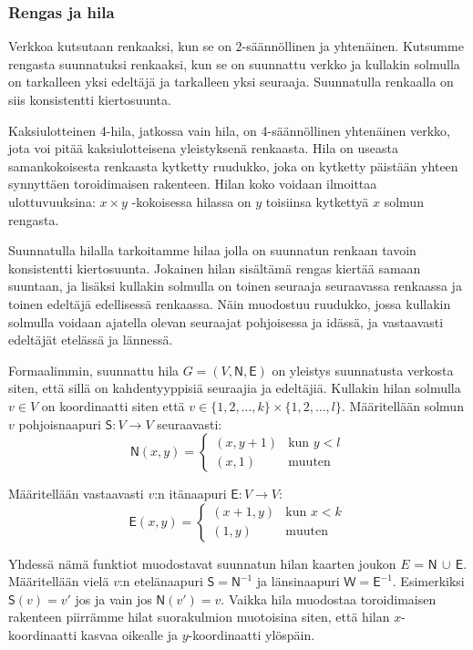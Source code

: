 \documentclass[12pt,finnish]{tktltiki2}
\theoremstyle{definition}
\theoremstyle{remark}
\begin{document}


\subsubsection{Rengas ja hila}

Verkkoa kutsutaan renkaaksi, kun se on $2$-säännöllinen ja yhtenäinen. Kutsumme rengasta suunnatuksi renkaaksi, kun se on suunnattu verkko ja kullakin solmulla on tarkalleen yksi edeltäjä ja tarkalleen yksi seuraaja. Suunnatulla renkaalla on siis konsistentti kiertosuunta.

Kaksiulotteinen 4-hila, jatkossa vain hila, on 4-säännöllinen yhtenäinen verkko, jota voi pitää kaksiulotteisena yleistyksenä renkaasta. Hila on useasta samankokoisesta renkaasta kytketty ruudukko, joka on kytketty päistään yhteen synnyttäen toroidimaisen rakenteen. Hilan koko voidaan ilmoittaa ulottuvuuksina: $x \times y$ -kokoisessa hilassa on $y$ toisiinsa kytkettyä $x$ solmun rengasta.

Suunnatulla hilalla tarkoitamme hilaa jolla on suunnatun renkaan tavoin konsistentti kiertosuunta. Jokainen hilan sisältämä rengas kiertää samaan suuntaan, ja lisäksi kullakin solmulla on toinen seuraaja seuraavassa renkaassa ja toinen edeltäjä edellisessä renkaassa. Näin muodostuu ruudukko, jossa kullakin solmulla voidaan ajatella olevan seuraajat pohjoisessa ja idässä, ja vastaavasti edeltäjät etelässä ja lännessä.

Formaalimmin, suunnattu hila $G = (V, \mathsf{N}, \mathsf{E})$ on yleistys suunnatusta verkosta siten, että sillä on kahdentyyppisiä seuraajia ja edeltäjiä. Kullakin hilan solmulla $v \in V$ on koordinaatti siten että $v \in \{1, 2, \ldots, k\} \times \{1, 2, \ldots, l\}$. Määritellään solmun $v$ pohjoisnaapuri $\mathsf{S}: V \rightarrow V$ seuraavasti:
\[ \mathsf{N}(x, y) = 
  \begin{cases}
   (x, y+1) & \text{kun } y < l \\
   (x, 1) & \text{muuten}
  \end{cases}
\]

Määritellään vastaavasti $v$:n itänaapuri $\mathsf{E}: V \rightarrow V$:
\[ \mathsf{E}(x, y) = 
  \begin{cases}
   (x+1, y) & \text{kun } x < k \\
   (1, y) & \text{muuten}
  \end{cases}
\]

Yhdessä nämä funktiot muodostavat suunnatun hilan kaarten joukon $E$ = $\mathsf{N} \, \cup \, \mathsf{E}$. Määritellään vielä $v$:n etelänaapuri $\mathsf{S} = \mathsf{N}^{-1}$ ja länsinaapuri $\mathsf{W} = \mathsf{E}^{-1}$. Esimerkiksi $\mathsf{S}(v) = v'$ jos ja vain jos $\mathsf{N}(v') = v$. Vaikka hila muodostaa toroidimaisen rakenteen piirrämme hilat suorakulmion muotoisina siten, että hilan $x$-koordinaatti kasvaa oikealle ja $y$-koordinaatti ylöspäin.
\end{document}
